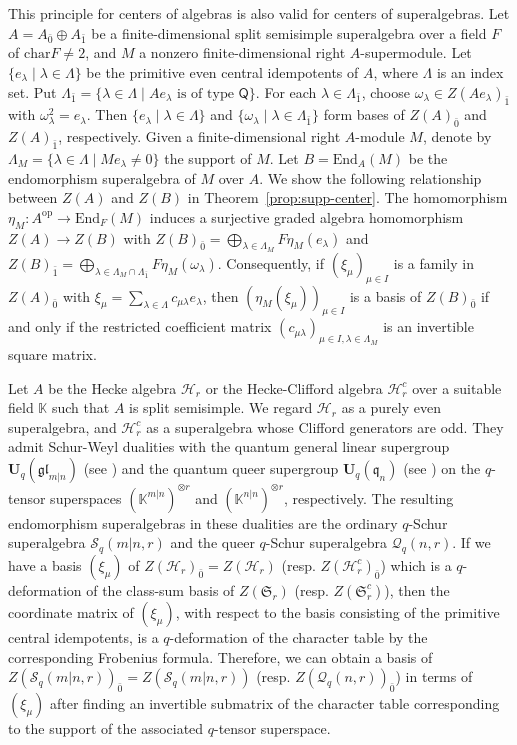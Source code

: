 \documentclass[11pt]{amsart}
\numberwithin{equation}{section}
\theoremstyle{plain}
\theoremstyle{definition}
\theoremstyle{remark}
\begin{document}
This principle for centers of algebras is also valid for centers of superalgebras. Let $A=A_{\bar{0}}\oplus A_{\bar{1}}$ be a finite-dimensional split semisimple superalgebra over a field $F$ of $\mathrm{char} F\neq2$, and $M$ a nonzero finite-dimensional right $A$-supermodule. Let $\{e_\lambda\mid \lambda\in\Lambda\}$ be the primitive even central idempotents of $A$, where $\Lambda$ is an index set. Put $\Lambda_{\bar{1}}=\{\lambda\in\Lambda\mid Ae_\lambda \text{ is of type $\mathsf{Q}$}\}$. For each $\lambda\in\Lambda_{\bar{1}}$, choose $\omega_\lambda\in Z(Ae_\lambda)_{\bar{1}}$ with $\omega_\lambda^2=e_\lambda$. Then $\{e_\lambda\mid\lambda\in\Lambda\}$ and $\{\omega_\lambda\mid\lambda\in\Lambda_{\bar{1}}\}$ form bases of $Z(A)_{\bar{0}}$ and $Z(A)_{\bar{1}}$, respectively. Given a finite-dimensional right $A$-module $M$, denote by $\Lambda_M=\{\lambda\in\Lambda\mid Me_\lambda\neq0\}$ the support of $M$. Let $B=\mathrm{End}_A(M)$ be the endomorphism superalgebra of $M$ over $A$. We show the following relationship between $Z(A)$ and $Z(B)$ in Theorem~\ref{prop:supp-center}. 
The homomorphism $\eta_M: A^{\mathrm{op}} \to \mathrm{End}_F(M)$ induces a surjective graded algebra homomorphism $Z(A)\to Z(B)$ with $Z(B)_{\bar{0}}=\bigoplus_{\lambda\in\Lambda_M} F \eta_M(e_\lambda)$ and $Z(B)_{\bar{1}}=\bigoplus_{\lambda\in\Lambda_M\cap \Lambda_{\bar{1}}} F \eta_M(\omega_\lambda)$.
Consequently, if $(\xi_\mu)_{\mu\in I}$ is a family in $Z(A)_{\bar{0}}$ with $\xi_\mu=\sum_{\lambda\in\Lambda} c_{\mu\lambda}e_\lambda$, then $(\eta_M(\xi_\mu))_{\mu\in I}$ is a basis of $Z(B)_{\bar{0}}$ if and only if the restricted coefficient matrix $(c_{\mu\lambda})_{\mu\in I,\lambda\in\Lambda_M}$ is an invertible square matrix. 

Let $A$ be the Hecke algebra $\mathcal{H}_r$ or the Hecke-Clifford algebra $\mathcal{H}_r^c$ over a suitable field $\mathbb{K}$ such that $A$ is split semisimple. We regard $\mathcal{H}_r$ as a purely even superalgebra, and $\mathcal{H}_r^c$ as a superalgebra whose Clifford generators are odd. They admit Schur-Weyl dualities with the quantum general linear supergroup $\mathbf{U}_q(\mathfrak{gl}_{m|n})$ (see \cite{Mi06}) and the quantum queer supergroup $\mathbf{U}_q(\mathfrak{q}_n)$ (see \cite{Ol92}) on the $q$-tensor superspaces $(\mathbb{K}^{m|n})^{\otimes r}$ and $(\mathbb{K}^{n|n})^{\otimes r}$, respectively. The resulting endomorphism superalgebras in these dualities are the ordinary $q$-Schur superalgebra $\mathcal{S}_q(m|n,r)$ and the queer $q$-Schur superalgebra $\mathcal{Q}_q(n,r)$. If we have a basis $(\xi_\mu)$ of $Z(\mathcal{H}_r)_{\bar{0}}=Z(\mathcal{H}_r)$ (resp. $Z(\mathcal{H}_r^c)_{\bar{0}}$) which is a $q$-deformation of the class-sum basis of $Z(\mathfrak{S}_r)$ (resp. $Z(\mathfrak{S}^c_r)$), then the coordinate matrix of $(\xi_\mu)$, with respect to the basis consisting of the primitive central idempotents, is a $q$-deformation of the character table by the corresponding Frobenius formula. Therefore, we can obtain a basis of $Z(\mathcal{S}_q(m|n,r))_{\bar{0}}=Z(\mathcal{S}_q(m|n,r))$ (resp. $Z(\mathcal{Q}_q(n,r))_{\bar{0}}$) in terms of $(\xi_\mu)$ after finding an invertible submatrix of the character table corresponding to the support of the associated $q$-tensor superspace.
\end{document}
